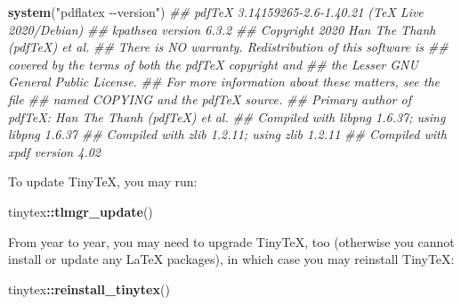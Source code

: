 \documentclass[
  12pt,
]{book}
\newenvironment{Shaded}{\begin{snugshade}}{\end{snugshade}}
\newcommand{\CommentTok}[1]{\textcolor[rgb]{0.56,0.35,0.01}{\textit{#1}}}
\newcommand{\KeywordTok}[1]{\textcolor[rgb]{0.13,0.29,0.53}{\textbf{#1}}}
\newcommand{\NormalTok}[1]{#1}
\newcommand{\OperatorTok}[1]{\textcolor[rgb]{0.81,0.36,0.00}{\textbf{#1}}}
\newcommand{\StringTok}[1]{\textcolor[rgb]{0.31,0.60,0.02}{#1}}
\begin{document}
\begin{Shaded}
\begin{Highlighting}[]
\KeywordTok{system}\NormalTok{(}\StringTok{"pdflatex {-}{-}version"}\NormalTok{)}
\CommentTok{\#\# pdfTeX 3.14159265{-}2.6{-}1.40.21 (TeX Live 2020/Debian)}
\CommentTok{\#\# kpathsea version 6.3.2}
\CommentTok{\#\# Copyright 2020 Han The Thanh (pdfTeX) et al.}
\CommentTok{\#\# There is NO warranty.  Redistribution of this software is}
\CommentTok{\#\# covered by the terms of both the pdfTeX copyright and}
\CommentTok{\#\# the Lesser GNU General Public License.}
\CommentTok{\#\# For more information about these matters, see the file}
\CommentTok{\#\# named COPYING and the pdfTeX source.}
\CommentTok{\#\# Primary author of pdfTeX: Han The Thanh (pdfTeX) et al.}
\CommentTok{\#\# Compiled with libpng 1.6.37; using libpng 1.6.37}
\CommentTok{\#\# Compiled with zlib 1.2.11; using zlib 1.2.11}
\CommentTok{\#\# Compiled with xpdf version 4.02}
\end{Highlighting}
\end{Shaded}

To update TinyTeX, you may run:

\begin{Shaded}
\begin{Highlighting}[]
\NormalTok{tinytex}\OperatorTok{::}\KeywordTok{tlmgr\_update}\NormalTok{()}
\end{Highlighting}
\end{Shaded}

From year to year, you may need to upgrade TinyTeX, too (otherwise you cannot install or update any LaTeX packages), in which case you may reinstall TinyTeX:

\begin{Shaded}
\begin{Highlighting}[]
\NormalTok{tinytex}\OperatorTok{::}\KeywordTok{reinstall\_tinytex}\NormalTok{()}
\end{Highlighting}
\end{Shaded}


\printindex
\end{document}

